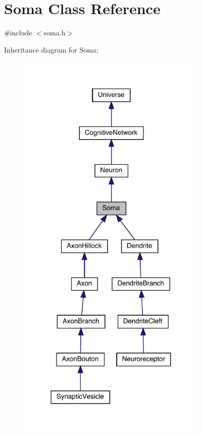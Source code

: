 \hypertarget{class_soma}{}\section{Soma Class Reference}
\label{class_soma}


{\ttfamily \#include $<$soma.\+h$>$}



Inheritance diagram for Soma\+:\nopagebreak
\begin{figure}[H]
\begin{center}
\leavevmode
\includegraphics[width=258pt]{class_soma__inherit__graph}
\end{center}
\end{figure}



